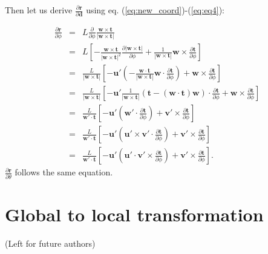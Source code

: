 \documentclass[12pt,a4paper]{scrarticle}
\begin{document}
Then let us derive $\frac{\partial{\mathbf{r} } }{\partial{\mathbf{d} }}$ using eq. (\ref{eq:new_coord})-(\ref{eq:eq4}):

\begin{eqnarray}
    \frac{\partial{\mathbf{r}}}{\partial \phi} & = &  L \frac{\partial}{\partial \phi} \frac{\mathbf{w} \times \mathbf{t}}{|\mathbf{w} \times \mathbf{t}|} \nonumber \\
    & = & L \left[ - \frac{\mathbf{w} \times \mathbf{t}}{|\mathbf{w} \times \mathbf{t}|^2} \frac{\partial |\mathbf{w} \times \mathbf{t}|}{\partial \phi} + \frac{1}{|\mathbf{w} \times \mathbf{t}|} \mathbf{w} \times \frac{\partial \mathbf{t}}{\partial \phi} \right] \nonumber \\
    & = & \frac{L}{|\mathbf{w} \times \mathbf{t}|}\left[ -\mathbf{u}' \left( -\frac{\mathbf{w} \cdot \mathbf{t}}{|\mathbf{w} \times \mathbf{t}|} \mathbf{w} \cdot \frac{\partial \mathbf{t}}{\partial \phi} \right)  + \mathbf{w} \times \frac{\partial \mathbf{t}}{\partial \phi}  \right] \nonumber \\
    & = & \frac{L}{|\mathbf{w} \times \mathbf{t}|}\left[ -\mathbf{u}' \frac{1}{|\mathbf{w} \times \mathbf{t}|} \left( \mathbf{t} - (\mathbf{w} \cdot \mathbf{t})\mathbf{w} \right) \cdot \frac{\partial \mathbf{t}}{\partial \phi} + \mathbf{w} \times \frac{\partial \mathbf{t}}{\partial \phi}  \right] \nonumber \\
    & = & \frac{L}{\mathbf{w}' \cdot \mathbf{t}}\left[ -\mathbf{u}' \left( \mathbf{w}' \cdot \frac{\partial \mathbf{t}}{\partial \phi} \right)  + \mathbf{v}' \times \frac{\partial \mathbf{t}}{\partial \phi}  \right] \nonumber \\
    & = & \frac{L}{\mathbf{w}' \cdot \mathbf{t}}\left[ -\mathbf{u}' \left( \mathbf{u}' \times \mathbf{v}' \cdot \frac{\partial \mathbf{t}}{\partial \phi} \right)  + \mathbf{v}' \times \frac{\partial \mathbf{t}}{\partial \phi}  \right] \nonumber \\   
    & = & \frac{L}{\mathbf{w}' \cdot \mathbf{t}}\left[ -\mathbf{u}' \left( \mathbf{u}' \cdot \mathbf{v}' \times \frac{\partial \mathbf{t}}{\partial \phi} \right)  + \mathbf{v}' \times \frac{\partial \mathbf{t}}{\partial \phi}  \right].    
\end{eqnarray}
$\frac{\partial \mathbf{r}}{\partial \theta}$ follows the same equation.

\section{Global to local transformation}
(Left for future authors)
\end{document}
